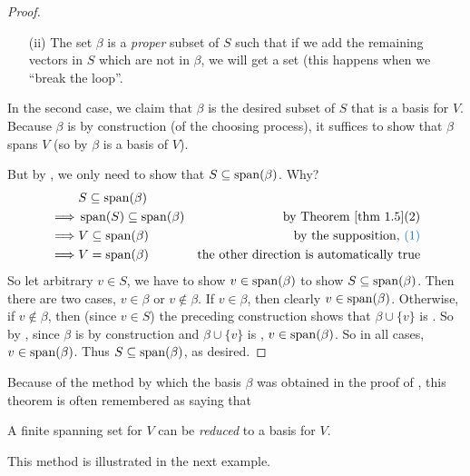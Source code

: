 \begin{proof}
\begin{enumerate}
\item [(ii)] The set \(\beta\) is a \emph{proper} \LID{} subset of \(S\) such that if we add the remaining vectors in \(S\) which are not in \(\beta\), we will get a \LDP{} set (this happens when we ``break the loop''.
\end{enumerate}
In the second case, we claim that \(\beta\) is the desired subset of \(S\) that is a basis for \(V\).
Because \(\beta\) is \LID{} by construction (of the choosing process), it suffices to show that \(\beta\) spans \(V\) (so by  \(\beta\) is a basis of \(V\)).

But by , we only need to show that \(S \subseteq \operatorname{span}(\beta)\).
Why?
\begin{align*}
             & S \subseteq \spann(\beta) \\
    \implies & \spann(S) \subseteq \spann(\beta) & \text{by \THM{1.5}}(2) \\
    \implies & V \subseteq \spann(\beta) & \text{by the supposition, \BLUE{(1)}} \\
    \implies & V = \spann(\beta) & \text{the other direction is automatically true}
\end{align*}
So let arbitrary \(v \in S\), we have to show \(v \in \operatorname{span}(\beta)\) to show \(S \subseteq \operatorname{span}(\beta)\).
Then there are two cases, \(v \in \beta\) or \(v \notin \beta\).
If \(v \in \beta\), then clearly \(v \in \operatorname{span}(\beta)\).
Otherwise, if \(v \notin \beta\), then (since \(v \in S\)) the preceding construction shows that \(\beta \cup \{ v \}\) is \LDP{}.
So by , since \(\beta\) is \LID{} by construction and \(\beta \cup \{ v \}\) is \LDP{}, \(v \in \operatorname{span}(\beta)\).
So in all cases, \(v \in \operatorname{span}(\beta)\).
Thus \(S \subseteq \operatorname{span}(\beta)\), as desired.
\end{proof}

\begin{remark} \label{remark 1.6.2}
Because of the method by which the basis \(\beta\) was obtained in the proof of , this theorem is often remembered as saying that
\begin{center}
    A finite spanning set for \(V\) can be \emph{reduced} to a basis for \(V\).
\end{center}
This method is illustrated in the next example.
\end{remark}

